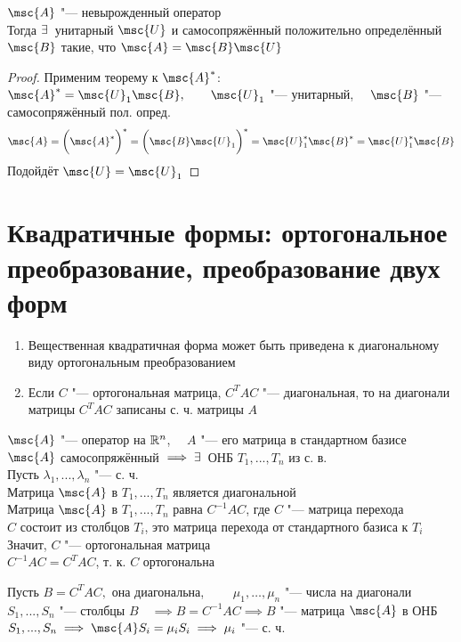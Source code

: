 \begin{implication}
	$ \msc{A} $ "--- невырожденный оператор \\
	Тогда $ \exists\, $ унитарный $ \msc{U} $ и самосопряжённый положительно определённый $ \msc{B} $ такие, что $ \msc{A} = \msc{B}\msc{U} $
\end{implication}

\begin{proof}
	Применим теорему к $ \msc{A}^* $: \\
	$ \msc{A}^* = \msc{U}_1\msc{B}, \qquad \msc{U}_1 $ "--- унитарный, $ \quad \msc{B} $ "--- самосопряжённый пол. опред.
	$$ \msc{A} = \bigg( \msc{A}^* \bigg)^* = \bigg( \msc{B}\msc{U}_1 \bigg)^* = \msc{U}_1^* \msc{B}^* = \msc{U}_1^*\msc{B} $$
	Подойдёт $ \msc{U} = \msc{U}_1 $
\end{proof}

\section{Квадратичные формы: ортогональное преобразование, преобразование двух форм}

\begin{theorem}
	\hfill
	\begin{enumerate}
		\item Вещественная квадратичная форма может быть приведена к диагональному виду ортогональным преобразованием

		\item Если $ C $ "--- ортогональная матрица, $ C^TAC $ "--- диагональная, то на диагонали матрицы $ C^TAC $ записаны с. ч. матрицы $ A $
	\end{enumerate}
\end{theorem}

\begin{eproof}
	\item $ \msc{A} $ "--- оператор на $ \mathbb{R}^n $, $ \quad A $ "--- его матрица в стандартном базисе \\
	$ \msc{A} $ самосопряжённый $ \implies \exists\, $ ОНБ $ T_1, ..., T_n $ из с. в. \\
	Пусть $ \lambda_1, ..., \lambda_n $ "--- с. ч. \\
	Матрица $ \msc{A} $ в $ T_1, ..., T_n $ является диагональной \\
	Матрица $ \msc{A} $ в $ T_1, ..., T_n $ равна $ C^{-1}AC $, где $ C $ "--- матрица перехода \\
	$ C $ состоит из столбцов $ T_i $, \as это матрица перехода от стандартного базиса к $ T_i $ \\
	Значит, $ C $ "--- ортогональная матрица \\
	$ C^{-1}AC = C^TAC $, т. к. $ C $ ортогональна

	\item Пусть $ B = C^TAC, $ она диагональна, $ \qquad \mu_1, \dots, \mu_n $ "--- числа на диагонали \\
	$ S_1, ..., S_n $ "--- столбцы $ B \quad \implies B = C^{-1}AC \implies B $ "--- матрица $ \msc{A} $ в ОНБ $ S_1, ..., S_n \implies \msc{A}S_i = \mu_iS_i \implies \mu_i $ "--- с. ч.
\end{eproof}

